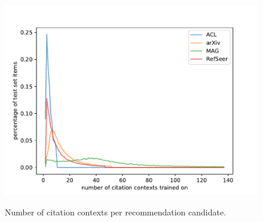 \begin{figure}
  \centering
    \includegraphics[width=.8\textwidth]{figures/evaluation/comparison_contexts_per_cited_doc.pdf}
  \label{fig:evalcomp}
  \caption{Number of citation contexts per recommendation candidate.}
\end{figure}

